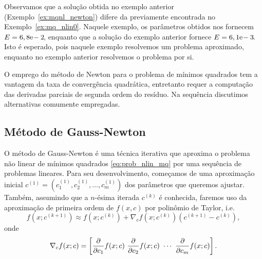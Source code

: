 \begin{ex}





\end{ex}

Observamos que a solução obtida no exemplo anterior (Exemplo~\ref{ex:mqnl_newton}) difere da previamente encontrada no Exemplo~\ref{ex:mq_nlin0}. Naquele exemplo, os parâmetros obtidos nos fornecem $E = 6,8\mathrm{e}\!-2\!$, enquanto que a solução do exemplo anterior fornece $E = 6,1\mathrm{e}\!-3\!$. Isto é esperado, pois naquele exemplo resolvemos um problema aproximado, enquanto no exemplo anterior resolvemos o problema por si.

O emprego do método de Newton para o problema de mínimos quadrados tem a vantagem da taxa de convergência quadrática, entretanto requer a computação das derivadas parciais de segunda ordem do resíduo. Na sequência discutimos alternativas comumente empregadas.

\subsection{Método de Gauss-Newton}
\badgeRevisar

O método de Gauss-Newton é uma técnica iterativa que aproxima o problema não linear de mínimos quadrados \eqref{eq:prob_nlin_mq} por uma sequência de problemas lineares. Para seu desenvolvimento, começamos de uma aproximação inicial $c^{(1)} = (c_1^{(1)}, c_2^{(1)}, \dotsc, c_m^{(1)})$ dos parâmetros que queremos ajustar. Também, assumindo que a $n$-ésima iterada $c^{(k)}$ é conhecida, faremos uso da aproximação de primeira ordem de $f(x,c)$ por polinômio de Taylor, i.e.
\begin{equation}
  f(x;c^{(k+1)}) \approx f(x;c^{(k)}) + \nabla_c f(x;c^{(k)})(c^{(k+1)}-c^{(k)}),
\end{equation}
onde
\begin{equation}
  \nabla_c f(x;c) = \left[\frac{\partial}{\partial c_1}f(x;c) ~\frac{\partial}{\partial c_2}f(x;c) ~\cdots ~\frac{\partial}{\partial c_m}f(x;c)\right].
\end{equation}


